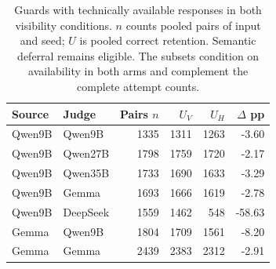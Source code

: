 \begin{table}[t]
\centering
\small
\caption{Guards with technically available responses in both visibility conditions. $n$ counts pooled pairs of input and seed; $U$ is pooled correct retention. Semantic deferral remains eligible. The subsets condition on availability in both arms and complement the complete attempt counts.}
\label{tab:s_availability}
\begin{tabular}{llrrrr}
\toprule
Source & Judge & Pairs $n$ & $U_V$ & $U_H$ & $\Delta$ pp \\
\midrule
Qwen9B & Qwen9B & 1335 & 1311 & 1263 & -3.60 \\
Qwen9B & Qwen27B & 1798 & 1759 & 1720 & -2.17 \\
Qwen9B & Qwen35B & 1733 & 1690 & 1633 & -3.29 \\
Qwen9B & Gemma & 1693 & 1666 & 1619 & -2.78 \\
Qwen9B & DeepSeek & 1559 & 1462 & 548 & -58.63 \\
Gemma & Qwen9B & 1804 & 1709 & 1561 & -8.20 \\
Gemma & Gemma & 2439 & 2383 & 2312 & -2.91 \\
\bottomrule
\end{tabular}
\end{table}
